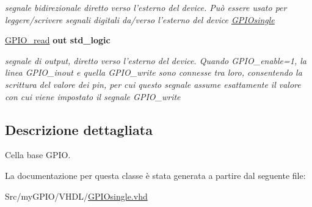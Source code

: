 \begin{DoxyCompactItemize}
\begin{DoxyCompactList}\small\item\em segnale bidirezionale diretto verso l'esterno del device. Può essere usato per leggere/scrivere segnali digitali da/verso l'esterno del device \hyperlink{class_g_p_i_osingle}{G\+P\+I\+Osingle} \end{DoxyCompactList}\item 
\hypertarget{class_g_p_i_osingle_ga4a6632a5d5cd6c4e6c1b634286795362}{\hyperlink{group___g_p_i_o-single_ga4a6632a5d5cd6c4e6c1b634286795362}{G\+P\+I\+O\+\_\+read}  {\bfseries {\bfseries \textcolor{vhdlchar}{out}\textcolor{vhdlchar}{ }}} {\bfseries \textcolor{vhdlchar}{std\+\_\+logic}\textcolor{vhdlchar}{ }} }\label{class_g_p_i_osingle_ga4a6632a5d5cd6c4e6c1b634286795362}

\begin{DoxyCompactList}\small\item\em segnale di output, diretto verso l'esterno del device. Quando G\+P\+I\+O\+\_\+enable=1, la linea G\+P\+I\+O\+\_\+inout e quella G\+P\+I\+O\+\_\+write sono connesse tra loro, consentendo la scrittura del valore dei pin, per cui questo segnale assume esattamente il valore con cui viene impostato il segnale G\+P\+I\+O\+\_\+write \end{DoxyCompactList}\end{DoxyCompactItemize}


\subsection{Descrizione dettagliata}
Cella base G\+P\+I\+O. 

La documentazione per questa classe è stata generata a partire dal seguente file\+:\begin{DoxyCompactItemize}
\item 
Src/my\+G\+P\+I\+O/\+V\+H\+D\+L/\hyperlink{_g_p_i_osingle_8vhd}{G\+P\+I\+Osingle.\+vhd}\end{DoxyCompactItemize}
